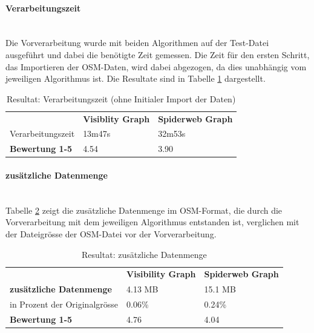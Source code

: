 \paragraph{Verarbeitungszeit}\label{result:Verarbeitungszeit}~\\
Die Vorverarbeitung wurde mit beiden Algorithmen auf der Test-Datei ausgeführt und dabei die benötigte Zeit gemessen. Die Zeit für den ersten Schritt, das Importieren der \ac{OSM}-Daten, wird dabei abgezogen, da dies unabhängig vom jeweiligen Algorithmus ist. Die Resultate sind in Tabelle \ref{Resultat: Verarbeitungszeit} dargestellt.

\begin{table}[H]
    \centering
    \caption{Resultat: Verarbeitungszeit (ohne Initialer Import der Daten)}
    \label{Resultat: Verarbeitungszeit}
    \begin{tabular}{lll}
        & \textbf{Visiblity Graph} & \textbf{Spiderweb Graph}     \\
        Verarbeitungszeit  &        13m47s                   & 32m53s    \\
        \textbf{Bewertung 1-5} &    4.54                     &  3.90
    \end{tabular}
\end{table}


\paragraph{zusätzliche Datenmenge}\label{result:zusätzliche Datenmenge}~\\
Tabelle \ref{table: zusätzliche Datenmenge} zeigt die zusätzliche Datenmenge im \ac{OSM}-Format, die durch die Vorverarbeitung mit dem jeweiligen Algorithmus entstanden ist, verglichen mit der Dateigrösse der \ac{OSM}-Datei vor der Vorverarbeitung.

\begin{table}[H]
    \centering
    \caption{Resultat: zusätzliche Datenmenge}
    \label{table: zusätzliche Datenmenge}
    \begin{tabular}{lll}
        & \textbf{Visibility Graph} & \textbf{Spiderweb Graph} \\
        \textbf{zusätzliche Datenmenge} & 4.13 MB                    & 15.1 MB  \\  
        in Prozent der Originalgrösse   & 0.06\%                     & 0.24\%   \\
        \textbf{Bewertung 1-5}          & 4.76                       & 4.04
    \end{tabular}
\end{table}

